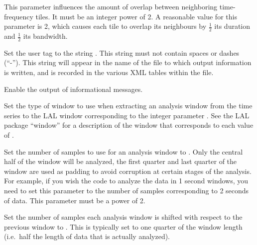 \begin{entry}
\begin{entry}
\item[\option{--tile-overlap-factor} \parm{factor}]
This parameter influences the amount of overlap between neighboring
time-frequency tiles.  It must be an integer power of 2.  A reasonable
value for this parameter is 2, which causes each tile to overlap its
neighbours by \(\frac{1}{2}\) its duration and \(\frac{1}{2}\) its
bandwidth.

\item[\option{--user-tag} \parm{comment}]
Set the user tag to the string .  This string must not
contain spaces or dashes (``-'').  This string will appear in the name of
the file to which output information is written, and is recorded in the
various XML tables within the file.

\item[\option{--verbose}]
Enable the output of informational messages.

\item[\option{--window} \parm{window}]
Set the type of window to use when extracting an analysis window from the
time series to the LAL window corresponding to the integer parameter
.  See the LAL package ``window'' for a description of the
window that corresponds to each value of .

\item[\option{--window-length} \parm{samples}]
Set the number of samples to use for an analysis window to .
Only the central half of the window will be analyzed, the first quarter and
last quarter of the window are used as padding to avoid corruption at
certain stages of the analysis.  For example, if you wish the code to
analyze the data in 1 second windows, you need to set this parameter to the
number of samples corresponding to 2 seconds of data.  This parameter must
be a power of 2.

\item[\option{--window-shift} \parm{samples}]
Set the number of samples each analysis window is shifted with respect to
the previous window to .  This is typically set to one
quarter of the window length (i.e.\ half the length of data that is
actually analyzed).

\end{entry}



\end{entry}
